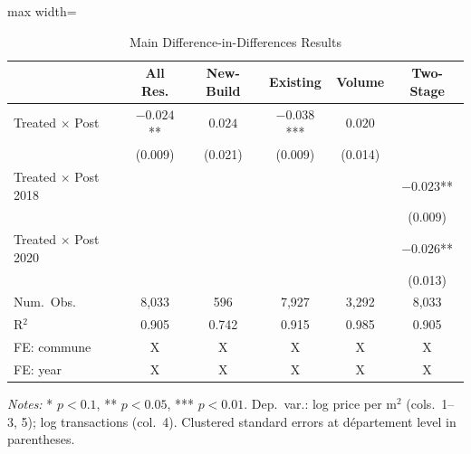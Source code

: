 \begin{table}[htbp]
\centering
\caption{Main Difference-in-Differences Results}
\label{tab:main}
\begin{adjustbox}{max width=\textwidth}
\begin{tabular}{lccccc}
\toprule
& All Res. & New-Build & Existing & Volume & Two-Stage \\
\midrule
Treated $\times$ Post & $-0.024$** & $0.024$ & $-0.038$*** & $0.020$ & \\
& (0.009) & (0.021) & (0.009) & (0.014) & \\
Treated $\times$ Post 2018 & & & & & $-0.023$** \\
& & & & & (0.009) \\
Treated $\times$ Post 2020 & & & & & $-0.026$** \\
& & & & & (0.013) \\
\midrule
Num.\ Obs. & 8,033 & 596 & 7,927 & 3,292 & 8,033 \\
R$^2$ & 0.905 & 0.742 & 0.915 & 0.985 & 0.905 \\
FE: commune & X & X & X & X & X \\
FE: year & X & X & X & X & X \\
\bottomrule
\end{tabular}
\end{adjustbox}
\par\smallskip\noindent\small\textit{Notes:} * $p < 0.1$, ** $p < 0.05$, *** $p < 0.01$. Dep.\ var.: log price per m$^2$ (cols.\ 1--3, 5); log transactions (col.\ 4). Clustered standard errors at d\'{e}partement level in parentheses.
\end{table}
